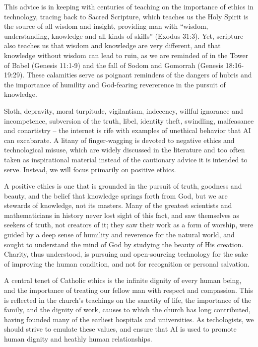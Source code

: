 \documentclass[sigplan,nonacm]{acmart}\settopmatter{printfolios=false,printccs=false,printacmref=false}
\begin{document}
  This advice is in keeping with centuries of teaching on the importance of ethics in technology, tracing back to Sacred Scripture, which teaches us the Holy Spirit is the source of all wisdom and insight, providing man with ``wisdom, understanding, knowledge and all kinds of skills'' (Exodus 31:3). Yet, scripture also teaches us that wisdom and knowledge are very different, and that knowledge without wisdom can lead to ruin, as we are reminded of in the Tower of Babel (Genesis 11:1-9) and the fall of Sodom and Gomorrah (Genesis 18:16-19:29). These calamities serve as poignant reminders of the dangers of hubris and the importance of humility and God-fearing revererence in the pursuit of knowledge.

  Sloth, depravity, moral turpitude, vigilantism, indecency, willful ignorance and incompetence, subversion of the truth, libel, identity theft, swindling, malfeasance and conartistry -- the internet is rife with examples of unethical behavior that AI can excabarate. A litany of finger-wagging is devoted to negative ethics and technological misuse, which are widely discussed in the literature and too often taken as inspirational material instead of the cautionary advice it is intended to serve. Instead, we will focus primarily on positive ethics.

  A positive ethics is one that is grounded in the pursuit of truth, goodness and beauty, and the belief that knowledge springs forth from God, but we are stewards of knowledge, not its masters. Many of the greatest scientists and mathematicians in history never lost sight of this fact, and saw themselves as seekers of truth, not creators of it; they saw their work as a form of worship, were guided by a deep sense of humility and reverence for the natural world, and sought to understand the mind of God by studying the beauty of His creation. Charity, thus understood, is pursuing and open-sourcing technology for the sake of improving the human condition, and not for recognition or personal salvation.

  A central tenet of Catholic ethics is the infinite dignity of every human being, and the importance of treating our fellow man with respect and compassion. This is reflected in the church's teachings on the sanctity of life, the importance of the family, and the dignity of work, causes to which the church has long contributed, having founded many of the earliest hospitals and universities. As techologists, we should strive to emulate these values, and ensure that AI is used to promote human dignity and heathly human relationships.
\end{document}
